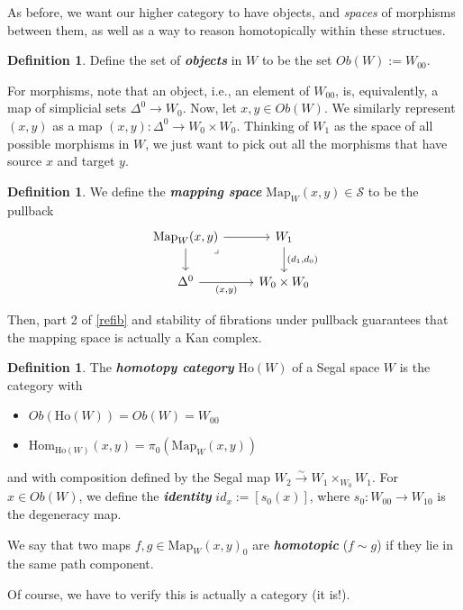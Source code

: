 \documentclass{article}
\newcommand{\textbi}[1]{\textbf{\textit{#1}}}
\newcommand{\cS}{\mathcal{S}}
\newcommand{\Ho}{\mathrm{Ho}}
\newcommand{\Hom}{\mathrm{Hom}}
\newcommand{\Map}{\mathrm{Map}}
\theoremstyle{definition}
\newtheorem{defin}[subsection]{Definition}
\begin{document}
As before, we want our higher category to have objects, and \textit{spaces} of morphisms between them, as well as a way to reason homotopically within these structues.

\begin{defin}
    Define the set of \textbi{objects} in $W$ to be the set $Ob(W):=W_{00}$.
\end{defin}

For morphisms, note that an object, i.e., an element of $W_{00}$, is, equivalently, a map of simplicial sets $\Delta^0\to W_0$. Now, let $x,y \in Ob(W)$. We similarly represent $(x,y)$ as a map $(x,y):\Delta^0\to W_0\times W_0$. Thinking of $W_1$ as the space of all possible morphisms in $W$, we just want to pick out all the morphisms that have source $x$ and target $y$. 

\begin{defin}
    We define the \textbi{mapping space} $\Map_W(x,y)\in \cS$ to be the pullback 
\[\begin{tikzcd}
	{\Map_W(x,y)} & {W_1} \\
	{\Delta^0} & {W_0\times W_0}
	\arrow[from=1-1, to=1-2]
	\arrow["{(d_1, d_0)}", from=1-2, to=2-2]
	\arrow[from=1-1, to=2-1]
	\arrow["{(x,y)}"', from=2-1, to=2-2]
	\arrow["\lrcorner"{anchor=center, pos=0.125}, draw=none, from=1-1, to=2-2]
\end{tikzcd}\]
\end{defin}

Then, part 2 of \ref{refib} and stability of fibrations under pullback guarantees that the mapping space is actually a Kan complex. 

\begin{defin}
    The \textbi{homotopy category} $\Ho(W)$ of a Segal space $W$ is the category with 
    \begin{itemize}
        \item $Ob(\Ho(W))=Ob(W)=W_{00}$
        \item $\Hom_{\Ho(W)}(x,y)=\pi_0(\Map_W(x,y))$
    \end{itemize}
    and with composition defined by the Segal map $W_2\xrightarrow{\sim} W_1\times_{W_0}W_1$. For $x\in Ob(W)$, we define the \textbi{identity} $id_x:=[s_0(x)]$, where $s_0:W_{00}\to W_{10}$ is the degeneracy map.
    \par We say that two maps $f,g\in \Map_W(x,y)_0$ are \textbi{homotopic} ($f\sim g$) if they lie in the same path component. 
\end{defin}

Of course, we have to verify this is actually a category (it is!).
\end{document}
